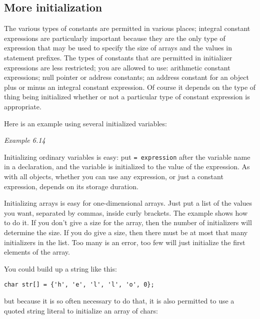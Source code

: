   

  \subsection{More initialization}
   

   The various types of constants are permitted in various places; integral
    constant expressions are particularly important because they are the only
    type of expression that may be used to specify the size of arrays and the
    values in \case{} statement prefixes. The types of constants that
    are permitted in initializer expressions are less restricted; you are
    allowed to use: arithmetic constant expressions; null pointer or address
    constants; an address constant for an object plus or minus an integral
    constant expression. Of course it depends on the type of thing being
    initialized whether or not a particular type of constant expression is
    appropriate.


   Here is an example using several initialized variables:


   \begin{center}\textit{Example 6.14}\end{center}


   Initializing ordinary variables is easy: put \texttt{= expression}
    after the variable name in a declaration, and the variable is initialized
    to the value of the expression. As with all objects, whether you can use
    any expression, or just a constant expression, depends on its storage
    duration.


   Initializing arrays is easy for one-dimensional arrays. Just put a list
    of the values you want, separated by commas, inside curly brackets. The
    example shows how to do it. If you don't give a size for the array, then
    the number of initializers will determine the size. If you do give a size,
    then there must be at most that many initializers in the list. Too many is
    an error, too few will just initialize the first elements of the array.


   You could build up a string like this:


   \begin{Verbatim}
char str[] = {'h', 'e', 'l', 'l', 'o', 0};
\end{Verbatim}

   but because it is so often necessary to do that, it is also permitted to
    use a quoted string literal to initialize an array of chars:



